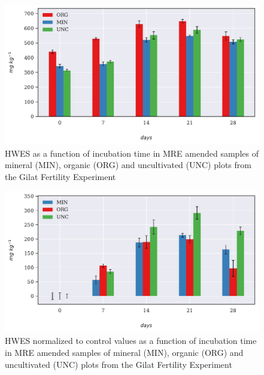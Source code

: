 			\begin{figure}[H]
				\centering
				\includegraphics[scale=0.8, width=\linewidth]{thesis_figures/main_incubation/MRE_treated/HWES.pdf}
				\caption{ \footnotesize	HWES as a function of incubation time in MRE amended samples of mineral (MIN), organic (ORG) and uncultivated (UNC) plots from the Gilat Fertility Experiment}
				\label{fig:hwes_treated_main}
			\end{figure}
			\begin{figure}[H]
				\centering
				\includegraphics[scale=0.8, width=\linewidth]{thesis_figures/main_incubation/control_normalized/HWES.pdf}
				\caption{HWES normalized to control values as a function of incubation time in MRE amended samples of mineral (MIN), organic (ORG) and uncultivated (UNC) plots from the Gilat Fertility Experiment}
				\label{fig:hwes_control_normalized_treated_main}
			\end{figure}

